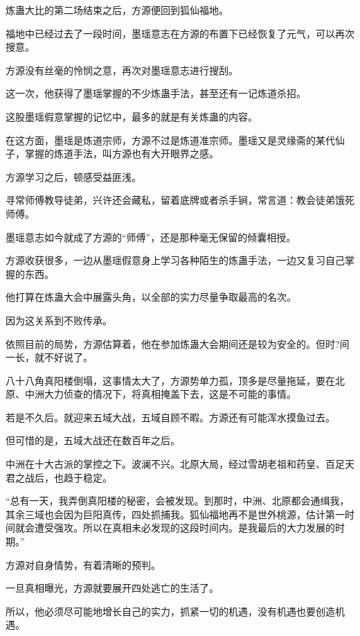 
\begin{this_body}



炼蛊大比的第二场结束之后，方源便回到狐仙福地。

福地中已经过去了一段时间，墨瑶意志在方源的布置下已经恢复了元气，可以再次搜意。

方源没有丝毫的怜悯之意，再次对墨瑶意志进行搜刮。

这一次，他获得了墨瑶掌握的不少炼蛊手法，甚至还有一记炼道杀招。

这股墨瑶假意掌握的记忆中，最多的就是有关炼蛊的内容。

在这方面，墨瑶是炼道宗师，方源不过是炼道准宗师。墨瑶又是灵缘斋的某代仙子，掌握的炼道手法，叫方源也有大开眼界之感。

方源学习之后，顿感受益匪浅。

寻常师傅教导徒弟，兴许还会藏私，留着底牌或者杀手锏，常言道：教会徒弟饿死师傅。

墨瑶意志如今就成了方源的“师傅”，还是那种毫无保留的倾囊相授。

方源收获很多，一边从墨瑶假意身上学习各种陌生的炼蛊手法，一边又复习自己掌握的东西。

他打算在炼蛊大会中展露头角，以全部的实力尽量争取最高的名次。

因为这关系到不败传承。

依照目前的局势，方源估算着，他在参加炼蛊大会期间还是较为安全的。但时?间一长，就不好说了。

八十八角真阳楼倒塌，这事情太大了，方源势单力孤，顶多是尽量拖延，要在北原、中洲大力侦查的情况下，将真相掩盖下去，这是不可能的事情。

若是不久后。就迎来五域大战，五域自顾不暇。方源还有可能浑水摸鱼过去。

但可惜的是，五域大战还在数百年之后。

中洲在十大古派的掌控之下。波澜不兴。北原大局，经过雪胡老祖和药皇、百足天君之战后，也趋于稳定。

“总有一天，我弄倒真阳楼的秘密，会被发现。到那时，中洲、北原都会通缉我，其余三域也会因为巨阳真传，四处抓捕我。狐仙福地再不是世外桃源，估计第一时间就会遭受强攻。所以在真相未必发现的这段时间内。是我最后的大力发展的时期。”

方源对自身情势，有着清晰的预判。

一旦真相曝光，方源就要展开四处逃亡的生活了。

所以，他必须尽可能地增长自己的实力，抓紧一切的机遇，没有机遇也要创造机遇。


\end{this_body}
